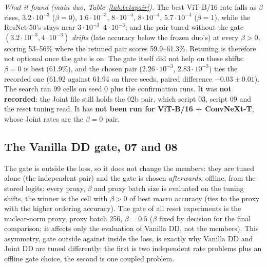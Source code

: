 \documentclass[10pt]{article}
\newcommand{\rl}[1]{\texttt{#1}}
\newcommand{\vit}{ViT-B/16}
\newcommand{\cnx}{ConvNeXt-T}
\newcommand{\rn}{ResNet-50}
\newcommand{\lr}[2]{\(#1{\cdot}10^{#2}\)}
\begin{document}
\emph{What it found (main duo, Table~\ref{tab:betapair}).} The best \vit{} rate falls as \(\beta\) rises, \lr{3.2}{-3} (\(\beta=0\)), \lr{1.6}{-3}, \lr{8}{-4}, \lr{8}{-4}, \lr{5.7}{-4} (\(\beta=1\)), while the \rn{}'s stays near \lr{3}{-3}--\lr{4}{-3}; and the pair tuned without the gate \((3.2{\cdot}10^{-3}, 4{\cdot}10^{-3})\) \emph{drifts} (late accuracy below the frozen duo's) at every \(\beta>0\), scoring 53--56\% where the retuned pair scores 59.9--61.3\%. Retuning is therefore not optional once the gate is on. The gate itself did not help on these shifts: \(\beta=0\) is best (61.9\%), and the chosen pair (\lr{2.26}{-3}, \lr{2.83}{-3}) ties the recorded one (61.92 against 61.94 on three seeds, paired difference \(-0.03\pm0.01\)). The search ran 99 cells on seed 0 plus the confirmation runs. It was \textbf{not recorded}: the Joint file still holds the 02b pair, which script 03, script 09 and the reset tuning read. It has \textbf{not been run for \vit{} + \cnx{}}, whose Joint rates are the \(\beta=0\) pair.

\begin{table}[H]
  \centering\small
  \caption{Joint DD on the main duo (\rl{scripts/02f\_tune\_joint\_gate.py}, seed 0, the four tuning shifts, gate inside the loss): the best pair at each \(\beta\), and what the pair tuned without the gate does at the same \(\beta\). ``drift'': its late accuracy is below the frozen duo's. At \(\beta=0\) the best cell is \((3.2{\cdot}10^{-3}, 2.83{\cdot}10^{-3})\); the search's tie rule chose the lower \((2.26{\cdot}10^{-3}, 2.83{\cdot}10^{-3})\) (61.93).}
  \label{tab:betapair}
  
\end{table}

\subsection{The Vanilla DD gate, 07 and 08}
The gate is outside the loss, so it does not change the members: they are tuned alone (the independent pair) and the gate is chosen \emph{afterwards}, offline, from the stored logits: every proxy, \(\beta\) and proxy batch size is evaluated on the tuning shifts, the winner is the cell with \(\beta>0\) of best macro accuracy (ties to the proxy with the higher ordering accuracy). The gate of all reset experiments is the nuclear-norm proxy, proxy batch 256, \(\beta=0.5\) (\(\beta\) fixed by decision for the final comparison; it affects only the evaluation of Vanilla DD, not the members). This asymmetry, gate outside against inside the loss, is exactly why Vanilla DD and Joint DD are tuned differently: the first is two independent rate problems plus an offline gate choice, the second is one coupled problem.
\end{document}

